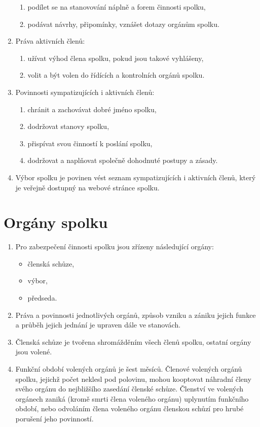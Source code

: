 \documentclass[11pt]{article}
\begin{document}
\begin{enumerate}
\begin{enumerate}
        \item podílet se na stanovování náplně a forem činnosti spolku,
        \item podávat návrhy, připomínky, vznášet dotazy orgánům spolku.
    \end{enumerate}
    \item Práva aktivních členů:
    \begin{enumerate}
        \item užívat výhod člena spolku, pokud jsou takové vyhlášeny,
        \item volit a být volen do řídících a kontrolních orgánů spolku.
    \end{enumerate}
    \item Povinnosti sympatizujících i aktivních členů:
    \begin{enumerate}
        \item chránit a zachovávat dobré jméno spolku,
        \item dodržovat stanovy spolku,
        \item přispívat svou činností k poslání spolku,
        \item dodržovat a naplňovat společně dohodnuté postupy a zásady.
    \end{enumerate}
    \item Výbor spolku je povinen vést seznam sympatizujících i aktivních členů,
    který je veřejně dostupný na webové stránce spolku. 
\end{enumerate}

\section{Orgány spolku}
\begin{enumerate}
    \item  Pro zabezpečení činnosti spolku jsou zřízeny následující orgány: 
    \begin{itemize}
        \item členská schůze,
        \item výbor,
        \item předseda.
    \end{itemize}
    \item Práva a povinnosti jednotlivých orgánů, způsob vzniku a zániku jejich 
    funkce a průběh jejich jednání je upraven dále ve stanovách.
    \item Členská schůze je tvořena shromážděním všech členů spolku, ostatní 
    orgány jsou volené.
    \item Funkční období volených orgánů je šest měsíců. Členové volených 
    orgánů spolku, jejichž počet neklesl pod polovinu, mohou kooptovat náhradní 
    členy svého orgánu do nejbližšího zasedání členské schůze. Členství 
    ve volených orgánech zaniká (kromě smrti člena voleného orgánu) uplynutím 
    funkčního období, nebo odvoláním člena voleného orgánu členskou schůzí 
    pro hrubé porušení jeho povinností.
\end{enumerate}
\end{document}
